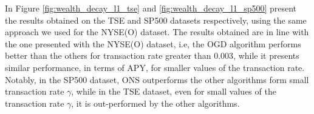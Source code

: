 In Figure \ref{fig:wealth_decay_l1_tse} and \ref{fig:wealth_decay_l1_sp500} present the results obtained on the TSE and SP500 datasets respectively, using the same approach we used for the NYSE(O) dataset.  The results obtained are in line with the one presented with the NYSE(O) dataset, i.e, the OGD algorithm performs better than the others for transaction rate greater than $0.003$, while it presents similar performance, in terms of APY, for smaller values of the transaction rate. Notably, in the SP500 dataset, ONS outperforms the other algorithms form small transaction rate $\gamma$, while in the TSE dataset, even for small values of the transaction rate $\gamma$, it is out-performed by the other algorithms.
